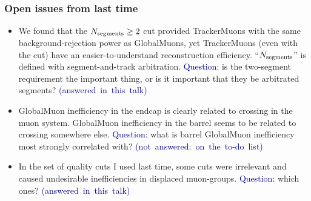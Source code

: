 \documentclass[compress]{beamer}
\newcommand{\s}[1]{{\mbox{\scriptsize #1}}}
\begin{document}
\begin{frame}
\frametitle{Open issues from last time}
\begin{itemize}\setlength{\itemsep}{0.25 cm}
\item We found that the $N_\s{segments} \ge 2$ cut provided
  TrackerMuons with the same background-rejection power as
  GlobalMuons, yet TrackerMuons (even with the cut) have an
  easier-to-understand reconstruction efficiency.
  ``$N_\s{segments}$'' is defined with segment-and-track arbitration.
  \textcolor{darkblue}{Question:} is the two-segment requirement the
  important thing, or is it important that they be arbitrated
  segments? \mbox{\textcolor{darkblue}{(answered in this talk)}}
\item GlobalMuon inefficiency in the endcap is clearly related to
  crossing in the muon system.  GlobalMuon inefficiency in the barrel
  seems to be related to crossing somewhere else.
  \textcolor{darkblue}{Question:} what is barrel GlobalMuon
  inefficiency most strongly correlated with?
  \mbox{\textcolor{darkblue}{(not answered: on the to-do list)}}
\item In the set of quality cuts I used last time, some cuts were
  irrelevant and caused undesirable inefficiencies in displaced
  muon-groups.  \textcolor{darkblue}{Question:} which ones?
  \mbox{\textcolor{darkblue}{(answered in this talk)}}
\end{itemize}
\end{frame}
\end{document}
